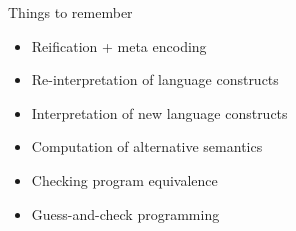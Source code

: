 \begin{frame}{Things to remember}
  \bigskip
  \begin{itemize}
  \item Reification + meta encoding
    \medskip
  \item Re-interpretation of language constructs
  \item Interpretation of new language constructs
    \medskip
  \item Computation of alternative semantics
  \item Checking program equivalence
    \medskip
  \item Guess-and-check programming
  \end{itemize}
\end{frame}
%
